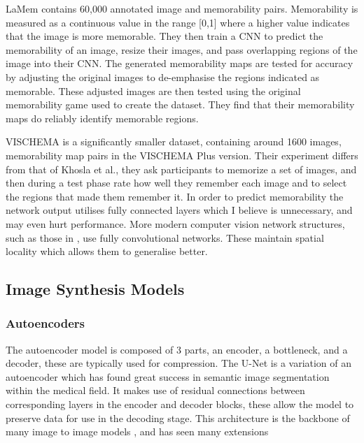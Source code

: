 \documentclass{UoYCSproject}
\begin{document}
LaMem contains 60,000 annotated image and memorability pairs. Memorability is measured as a continuous value in the range [0,1] where a higher value indicates that the image is more memorable. They then train a CNN to predict the memorability of an image, resize their images, and pass overlapping regions of the image into their CNN. The generated memorability maps are tested for accuracy by adjusting the original images to de-emphasise the regions indicated as memorable. These adjusted images are then tested using the original memorability game used to create the dataset. They find that their memorability maps do reliably identify memorable regions.

VISCHEMA is a significantly smaller dataset, containing around 1600 images, memorability map pairs in the VISCHEMA Plus version. Their experiment differs from that of Khosla et al., they ask participants to memorize a set of images, and then during a test phase rate how well they remember each image and to select the regions that made them remember it. In order to predict memorability the network output utilises fully connected layers which I believe is unnecessary, and may even hurt performance. More modern computer vision network structures, such as those in \cite{ronneberger2015unet, goodfellow2014generative, ho2020denoising, isola2018imagetoimage, saharia2022palette}, use fully convolutional networks. These maintain spatial locality which allows them to generalise better.


\subsection{Image Synthesis Models}

\subsubsection{Autoencoders}

The autoencoder model is composed of 3 parts, an encoder, a bottleneck, and a decoder, these are typically used for compression. The U-Net \cite{ronneberger2015unet} is a variation of an autoencoder which has found great success in semantic image segmentation within the medical field. It makes use of residual connections between corresponding layers in the encoder and decoder blocks, these allow the model to preserve data for use in the decoding stage. This architecture is the backbone of many image to image models \cite{isola2018imagetoimage,saharia2022palette,dhariwal2021diffusion}, and has seen many extensions \cite{zhou2020unet, Qin_2020}
\end{document}
